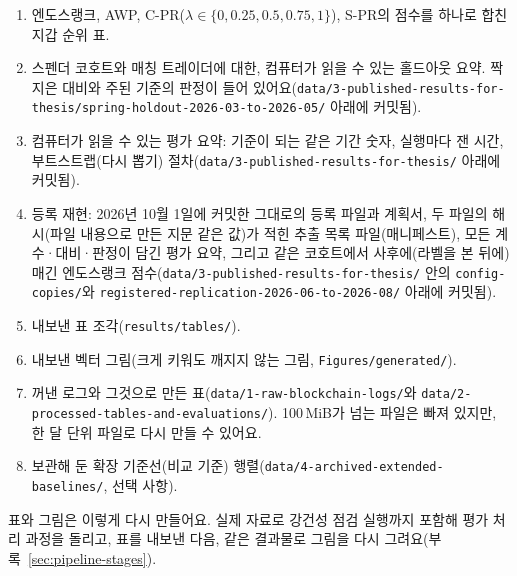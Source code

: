 \begin{enumerate}
\item 엔도스랭크, AWP, C-PR($\lambda\in\{0,0.25,0.5,0.75,1\}$), S-PR의 점수를 하나로 합친 지갑 순위 표.
\item 스펜더 코호트와 매칭 트레이더에 대한, 컴퓨터가 읽을 수 있는 홀드아웃 요약. 짝지은 대비와 주된 기준의 판정이 들어 있어요(\texttt{data/3-published-results-for-thesis/spring-holdout-2026-03-to-2026-05/} 아래에 커밋됨).
\item 컴퓨터가 읽을 수 있는 평가 요약: 기준이 되는 같은 기간 숫자, 실행마다 잰 시간, 부트스트랩(다시 뽑기) 절차(\texttt{data/3-published-results-for-thesis/} 아래에 커밋됨).
\item 등록 재현: 2026년 10월 1일에 커밋한 그대로의 등록 파일과 계획서, 두 파일의 해시(파일 내용으로 만든 지문 같은 값)가 적힌 추출 목록 파일(매니페스트), 모든 계수·대비·판정이 담긴 평가 요약, 그리고 같은 코호트에서 사후에(라벨을 본 뒤에) 매긴 엔도스랭크 점수(\texttt{data/3-published-results-for-thesis/} 안의 \texttt{config-copies/}와 \texttt{registered-replication-2026-06-to-2026-08/} 아래에 커밋됨).
\item 내보낸 표 조각(\texttt{results/tables/}).
\item 내보낸 벡터 그림(크게 키워도 깨지지 않는 그림, \texttt{Figures/generated/}).
\item 꺼낸 로그와 그것으로 만든 표(\texttt{data/1-raw-blockchain-logs/}와 \texttt{data/2-processed-tables-and-evaluations/}). 100\,MiB가 넘는 파일은 빠져 있지만, 한 달 단위 파일로 다시 만들 수 있어요.
\item 보관해 둔 확장 기준선(비교 기준) 행렬(\texttt{data/4-archived-extended-baselines/}, 선택 사항).
\end{enumerate}

표와 그림은 이렇게 다시 만들어요. 실제 자료로 강건성 점검 실행까지 포함해 평가 처리 과정을 돌리고, 표를 내보낸 다음, 같은 결과물로 그림을 다시 그려요(부록~\ref{sec:pipeline-stages}).
